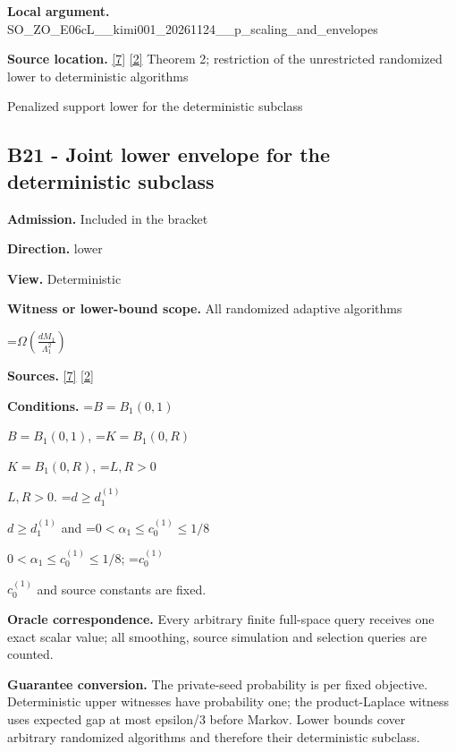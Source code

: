 \documentclass[10pt,a4paper]{article}
\newcommand{\AtlasMath}[1]{\par\begingroup\centering\setbox0=\hbox{$\displaystyle #1$}\ifdim\wd0>1.4\linewidth\typeout{ATLAS WIDE FORMULA: \the\wd0}\fi\ifdim\wd0>\linewidth\resizebox{\linewidth}{!}{\box0}\else\box0\fi\par\endgroup}
\newcommand{\AtlasInlineMath}[1]{\begingroup\setbox0=\hbox{$#1$}\ifdim\wd0>.4\linewidth\endgroup\AtlasMath{#1}\else\endgroup$#1$\fi}
\begin{document}
\textbf{Local argument.} SO\_ZO\_E06cL\_\_kimi001\_202\allowbreak{}61124\_\_p\_scaling\_and\_env\allowbreak{}elopes



\textbf{Source location.} \href{https://github.com/WU-Wendao/Colombo/blob/main/colombo_sensorium/Complexity_altas/data/sources/colombo/COLOMBO_KIMI_001/kimi_001.pdf}{[7]} \href{https://arxiv.org/html/2607.16558v2}{[2]} Theorem 2; restriction of the unrestricted randomized lower to deterministic algorithms



Penalized support lower for the deterministic subclass



\subsection{B21 - Joint lower envelope for the deterministic subclass}


\textbf{Admission.} Included in the bracket



\textbf{Direction.} lower



\textbf{View.} Deterministic



\textbf{Witness or lower-bound scope.} All randomized adaptive algorithms



\AtlasMath{\Omega\!\left(\frac{dM_1}{\Lambda_1^2}\right)}


\textbf{Sources.} \href{https://github.com/WU-Wendao/Colombo/blob/main/colombo_sensorium/Complexity_altas/data/sources/colombo/COLOMBO_KIMI_001/kimi_001.pdf}{[7]} \href{https://arxiv.org/html/2607.16558v2}{[2]}



\textbf{Conditions.} \AtlasInlineMath{B=B_1(0,1)}, \AtlasInlineMath{K=B_1(0,R)}, \AtlasInlineMath{L,R>0}. \AtlasInlineMath{d\ge d_1^{(1)}} and \AtlasInlineMath{0<\alpha_1\le c_0^{(1)}\le1/8}; \AtlasInlineMath{c_0^{(1)}} and source constants are fixed.



\textbf{Oracle correspondence.} Every arbitrary finite full-space query receives one exact scalar value; all smoothing, source simulation and selection queries are counted.



\textbf{Guarantee conversion.} The private-seed probability is per fixed objective. Deterministic upper witnesses have probability one; the product-Laplace witness uses expected gap at most epsilon/3 before Markov. Lower bounds cover arbitrary randomized algorithms and therefore their deterministic subclass.
\end{document}
